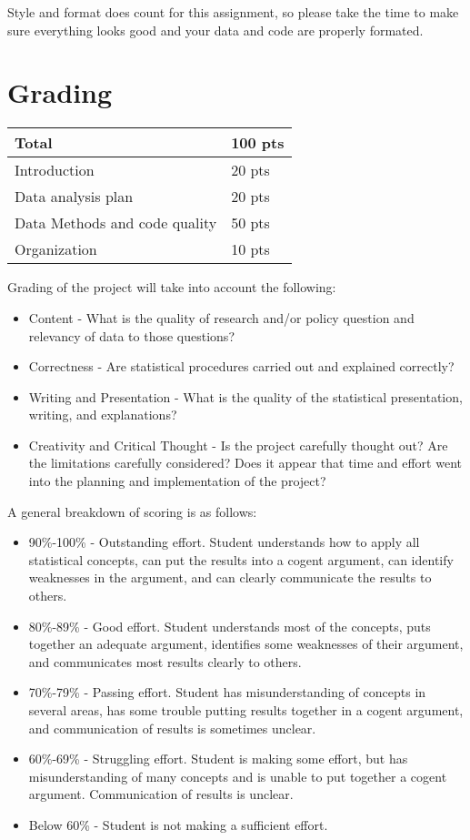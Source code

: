 \documentclass[
]{book}
\providecommand{\tightlist}{%
  \setlength{\itemsep}{0pt}\setlength{\parskip}{0pt}}
\begin{document}
Style and format does count for this assignment, so please take the time to make
sure everything looks good and your data and code are properly formated.

\hypertarget{grading}{%
\section{Grading}\label{grading}}

\begin{longtable}[]{@{}ll@{}}
\toprule
Total & 100 pts \\
\midrule
\endhead
Introduction & 20 pts \\
Data analysis plan & 20 pts \\
Data Methods and code quality & 50 pts \\
Organization & 10 pts \\
\bottomrule
\end{longtable}

Grading of the project will take into account the following:

\begin{itemize}
\tightlist
\item
  Content - What is the quality of research and/or policy question and relevancy
  of data to those questions?
\item
  Correctness - Are statistical procedures carried out and explained correctly?
\item
  Writing and Presentation - What is the quality of the statistical presentation,
  writing, and explanations?
\item
  Creativity and Critical Thought - Is the project carefully thought out? Are the
  limitations carefully considered? Does it appear that time and effort went into
  the planning and implementation of the project?
\end{itemize}

A general breakdown of scoring is as follows:

\begin{itemize}
\tightlist
\item
  90\%-100\% - Outstanding effort. Student understands how to apply all statistical
  concepts, can put the results into a cogent argument, can identify weaknesses in
  the argument, and can clearly communicate the results to others.
\item
  80\%-89\% - Good effort. Student understands most of the concepts, puts together
  an adequate argument, identifies some weaknesses of their argument, and communicates
  most results clearly to others.
\item
  70\%-79\% - Passing effort. Student has misunderstanding of concepts in several
  areas, has some trouble putting results together in a cogent argument, and communication
  of results is sometimes unclear.
\item
  60\%-69\% - Struggling effort. Student is making some effort, but has misunderstanding
  of many concepts and is unable to put together a cogent argument. Communication
  of results is unclear.
\item
  Below 60\% - Student is not making a sufficient effort.
\end{itemize}
\end{document}
